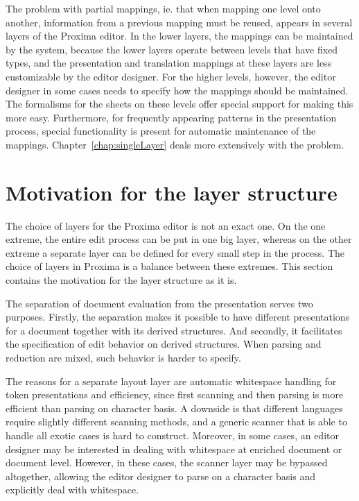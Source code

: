 The problem with partial mappings, ie. that when mapping one level onto another, information from a previous mapping must be reused, appears in several layers of the Proxima editor. In the lower layers, the mappings can be maintained by the system, because the lower layers operate between levels that have fixed types, and the presentation and translation mappings at these layers are less customizable by the editor designer. For the higher levels, however, the editor designer in some cases needs to specify how the mappings should be maintained. The formalisms for the sheets on these levels offer special support for making this more easy. Furthermore, for frequently appearing patterns in the presentation process, special functionality is present for automatic maintenance of the mappings. Chapter~\ref{chap:singleLayer} deals more extensively with the problem.

\section{Motivation for the layer structure}

The choice of layers for the Proxima editor is not an exact one. On the one extreme, the entire edit process can be put in one big layer, whereas on the other extreme a separate layer can be defined for every small step in the process. The choice of layers in Proxima is a balance between these extremes. This section contains the motivation for the layer structure as it is.

The separation of document evaluation from the presentation serves two purposes. Firstly, the separation makes it possible to have different presentations for a document together with its derived structures. And secondly, it facilitates the specification of edit behavior on derived structures. When parsing and reduction are mixed, such behavior is harder to specify.

The reasons for a separate layout layer are automatic whitespace handling for token presentations and efficiency, since first scanning and then parsing is more efficient than parsing on character basis. A downside is that different languages require slightly different scanning methods, and a generic scanner that is able to handle all exotic cases is hard to construct. Moreover, in some cases, an editor designer may be interested in dealing with whitespace at enriched document or document level. However, in these cases, the scanner layer may be bypassed altogether, allowing the editor designer to parse on a character basis and explicitly deal with whitespace.

